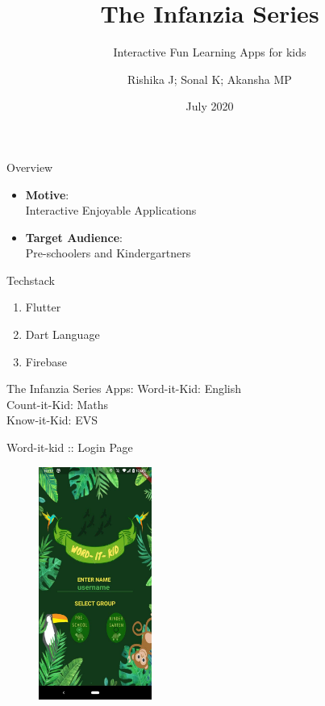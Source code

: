 \documentclass[14pt]{beamer}
\title[SlideSpeak]{The Infanzia Series}
\subtitle{Interactive Fun Learning Apps for kids}
\author[Team 16]{Rishika J; Sonal K; Akansha MP}
\date{July 2020}
\begin{document}
\begin{frame}
    \titlepage
\end{frame}


\begin{frame}{Overview}
    \pause
    \begin{itemize}
    \item \textbf{Motive}: \\
            Interactive Enjoyable Applications
        \pause
    \item \textbf{Target Audience}: \\
            Pre-schoolers and Kindergartners
    \end{itemize}
\end{frame}

\begin{frame}{Techstack}
    \pause
    \begin{enumerate}
        \item Flutter
        \item Dart Language
        \item Firebase  
    \end{enumerate}
\end{frame}

\begin{frame}[standout]
    The Infanzia Series Apps: 
    \pause
    \alert{Word-it-Kid: English} \\
    \pause
    \alert{Count-it-Kid: Maths} \\
    \pause
    \alert{Know-it-Kid: EVS} 
\end{frame}

\begin{frame}{Word-it-kid :: Login Page}
    \begin{figure}[ht]
    \includegraphics[height=3in]{LoginPage.JPG}
    \end{figure}
\end{frame}
\end{document}
